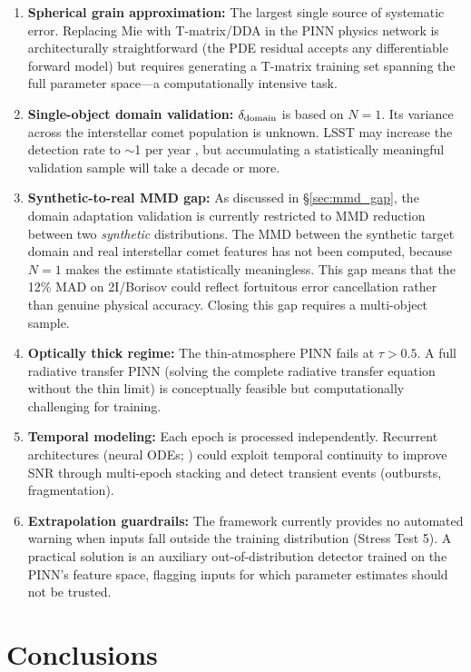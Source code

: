\documentclass[preprint2]{aastex631}
\begin{document}
\begin{enumerate}
    \item \textbf{Spherical grain approximation:} The largest single source of systematic error. Replacing Mie with T-matrix/DDA in the PINN physics network is architecturally straightforward (the PDE residual accepts any differentiable forward model) but requires generating a T-matrix training set spanning the full parameter space---a computationally intensive task.
    \item \textbf{Single-object domain validation:} $\delta_{\rm domain}$ is based on $N=1$. Its variance across the interstellar comet population is unknown. LSST may increase the detection rate to $\sim$1 per year \citep{jones18}, but accumulating a statistically meaningful validation sample will take a decade or more.
    \item \textbf{Synthetic-to-real MMD gap:} As discussed in \S\ref{sec:mmd_gap}, the domain adaptation validation is currently restricted to MMD reduction between two \textit{synthetic} distributions. The MMD between the synthetic target domain and real interstellar comet features has not been computed, because $N=1$ makes the estimate statistically meaningless. This gap means that the 12\% MAD on 2I/Borisov could reflect fortuitous error cancellation rather than genuine physical accuracy. Closing this gap requires a multi-object sample.
    \item \textbf{Optically thick regime:} The thin-atmosphere PINN fails at $\tau > 0.5$. A full radiative transfer PINN (solving the complete radiative transfer equation without the thin limit) is conceptually feasible but computationally challenging for training.
    \item \textbf{Temporal modeling:} Each epoch is processed independently. Recurrent architectures (neural ODEs; \citealt{chen18}) could exploit temporal continuity to improve SNR through multi-epoch stacking and detect transient events (outbursts, fragmentation).
    \item \textbf{Extrapolation guardrails:} The framework currently provides no automated warning when inputs fall outside the training distribution (Stress Test 5). A practical solution is an auxiliary out-of-distribution detector trained on the PINN's feature space, flagging inputs for which parameter estimates should not be trusted.
\end{enumerate}

\section{Conclusions}\label{sec:conclusions}
\end{document}
